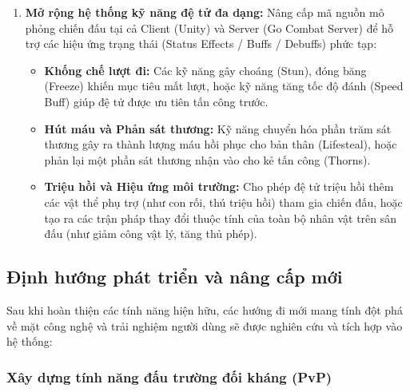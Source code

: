 \documentclass[../Project.tex]{subfiles}
\begin{document}
\begin{enumerate}
    \item \textbf{Mở rộng hệ thống kỹ năng đệ tử đa dạng:}
    Nâng cấp mã nguồn mô phỏng chiến đấu tại cả Client (Unity) và Server (Go Combat Server) để hỗ trợ các hiệu ứng trạng thái (Status Effects / Buffs / Debuffs) phức tạp:
    \begin{itemize}
        \item \textbf{Khống chế lượt đi:} Các kỹ năng gây choáng (Stun), đóng băng (Freeze) khiến mục tiêu mất lượt, hoặc kỹ năng tăng tốc độ đánh (Speed Buff) giúp đệ tử được ưu tiên tấn công trước.
        \item \textbf{Hút máu và Phản sát thương:} Kỹ năng chuyển hóa phần trăm sát thương gây ra thành lượng máu hồi phục cho bản thân (Lifesteal), hoặc phản lại một phần sát thương nhận vào cho kẻ tấn công (Thorns).
        \item \textbf{Triệu hồi và Hiệu ứng môi trường:} Cho phép đệ tử triệu hồi thêm các vật thể phụ trợ (như con rối, thú triệu hồi) tham gia chiến đấu, hoặc tạo ra các trận pháp thay đổi thuộc tính của toàn bộ nhân vật trên sân đấu (như giảm công vật lý, tăng thủ phép).
    \end{itemize}
\end{enumerate}

\subsection{Định hướng phát triển và nâng cấp mới}
\label{sec:new_directions}

Sau khi hoàn thiện các tính năng hiện hữu, các hướng đi mới mang tính đột phá về mặt công nghệ và trải nghiệm người dùng sẽ được nghiên cứu và tích hợp vào hệ thống:

\subsubsection{Xây dựng tính năng đấu trường đối kháng (PvP)}
\end{document}
